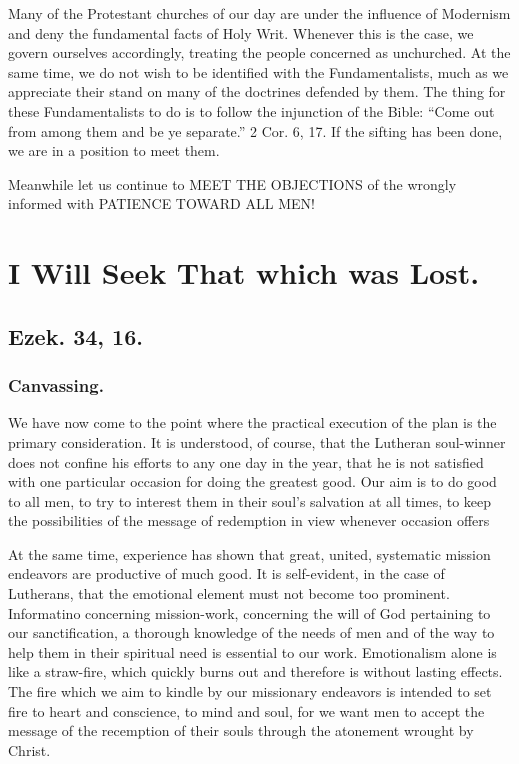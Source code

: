 \documentclass[
]{book}
\begin{document}
Many of the Protestant churches of our day are under the influence of Modernism and deny the fundamental facts of Holy Writ. Whenever this is the case, we govern ourselves accordingly, treating the people concerned as unchurched. At the same time, we do not wish to be identified with the Fundamentalists, much as we appreciate their stand on many of the doctrines defended by them. The thing for these Fundamentalists to do is to follow the injunction of the Bible: ``Come out from among them and be ye separate.'' 2 Cor. 6, 17. If the sifting has been done, we are in a position to meet them.

Meanwhile let us continue to MEET THE OBJECTIONS of the wrongly informed with PATIENCE TOWARD ALL MEN!

\hypertarget{i-will-seek-that-which-was-lost.}{%
\chapter{I Will Seek That which was Lost.}\label{i-will-seek-that-which-was-lost.}}

\hypertarget{ezek.-34-16.}{%
\section*{Ezek. 34, 16.}\label{ezek.-34-16.}}

\hypertarget{canvassing.}{%
\subsection*{Canvassing.}\label{canvassing.}}

We have now come to the point where the practical execution of the plan is the primary consideration. It is understood, of course, that the Lutheran soul-winner does not confine his efforts to any one day in the year, that he is not satisfied with one particular occasion for doing the greatest good. Our aim is to do good to all men, to try to interest them in their soul's salvation at all times, to keep the possibilities of the message of redemption in view whenever occasion offers

At the same time, experience has shown that great, united, systematic mission endeavors are productive of much good. It is self-evident, in the case of Lutherans, that the emotional element must not become too prominent. Informatino concerning mission-work, concerning the will of God pertaining to our sanctification, a thorough knowledge of the needs of men and of the way to help them in their spiritual need is essential to our work. Emotionalism alone is like a straw-fire, which quickly burns out and therefore is without lasting effects. The fire which we aim to kindle by our missionary endeavors is intended to set fire to heart and conscience, to mind and soul, for we want men to accept the message of the recemption of their souls through the atonement wrought by Christ.
\end{document}

